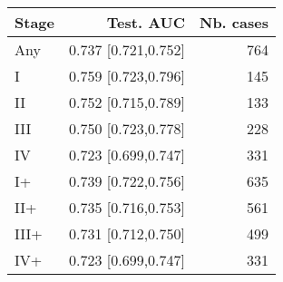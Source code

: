 \begin{table}[ht]
\centering
\begin{tabular}{lrr}
  \toprule
Stage & Test. AUC & Nb. cases \\ 
  \midrule
Any & 0.737 [0.721,0.752] & 764 \\ 
   \addlinespace
I & 0.759 [0.723,0.796] & 145 \\ 
  II & 0.752 [0.715,0.789] & 133 \\ 
  III & 0.750 [0.723,0.778] & 228 \\ 
  IV & 0.723 [0.699,0.747] & 331 \\ 
   \addlinespace
I+ & 0.739 [0.722,0.756] & 635 \\ 
  II+ & 0.735 [0.716,0.753] & 561 \\ 
  III+ & 0.731 [0.712,0.750] & 499 \\ 
  IV+ & 0.723 [0.699,0.747] & 331 \\ 
   \bottomrule
\end{tabular}
\end{table}
